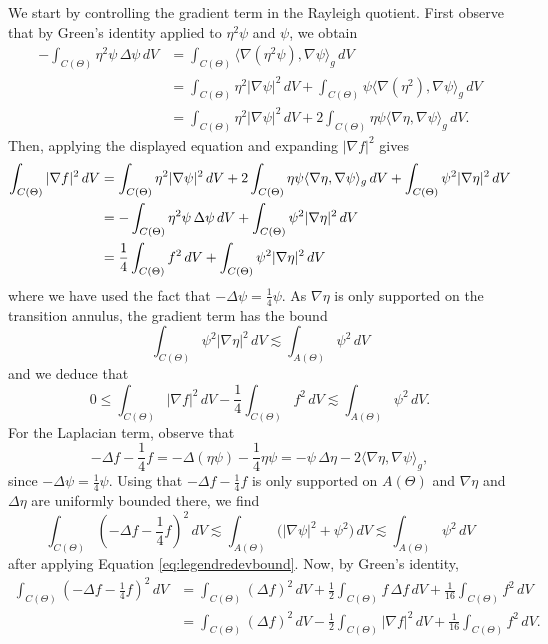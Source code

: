 \documentclass[11pt]{amsart}
\theoremstyle{definition}
\numberwithin{equation}{section}
\newcommand{\lapl}{\Delta}
\newcommand{\grad}{\nabla}
\begin{document}
We start by controlling the gradient term in the Rayleigh quotient. First observe that by Green's identity applied to $\eta^2\psi$ and $\psi$, we obtain
\begin{align*}
-\int_{C(\Theta)} \eta^2\psi\,\Delta\psi\,dV
&= \int_{C(\Theta)} \langle \grad(\eta^2\psi),\grad\psi\rangle_g\,dV \\
&= \int_{C(\Theta)} \eta^2|\grad\psi|^2\,dV
  + \int_{C(\Theta)} \psi\langle \grad(\eta^2),\grad\psi\rangle_g\,dV \\
&= \int_{C(\Theta)} \eta^2|\grad\psi|^2\,dV
  + 2\int_{C(\Theta)} \eta\psi\langle \grad\eta,\grad\psi\rangle_g\,dV.
\end{align*}
Then, applying the displayed equation and expanding $|\grad f|^2$ gives
\begin{align*}
\int_{C(\Theta)} |\grad f|^2\,dV
&= \int_{C(\Theta)} \eta^2|\grad\psi|^2\,dV + 2\int_{C(\Theta)} \eta\psi\langle \grad\eta,\grad\psi\rangle_g\,dV
 + \int_{C(\Theta)} \psi^2|\grad\eta|^2\,dV
  \notag\\
&=
-\int_{C(\Theta)} \eta^2\psi\,\Delta\psi\,dV
   + \int_{C(\Theta)} \psi^2|\grad\eta|^2\,dV \notag\\
&= \frac14\int_{C(\Theta)} f^2\,dV
   + \int_{C(\Theta)} \psi^2|\grad\eta|^2\,dV
\end{align*}
where we have used the fact that $-\lapl \psi = \frac{1}{4}\psi$.  As $\grad \eta$ is only supported on the transition annulus, the gradient term has the bound
\[
\int_{C(\Theta)} \psi^2|\grad \eta|^2 \,dV \lesssim \int_{A(\Theta)} \psi^2 \, dV
\]
and we deduce that
\begin{equation}\label{eq:vibTTgrad-id}
0 \leq \int_{C(\Theta)} |\grad f|^2 \, dV - \frac{1}{4} \int_{C(\Theta)} f^2 \, dV \lesssim \int_{A(\Theta)} \psi^2 \,dV.
\end{equation}
For the Laplacian term, observe that
\[
-\lapl f-\frac14 f
= -\lapl(\eta\psi)-\frac14\eta\psi
= -\psi\,\lapl\eta-2\langle \grad\eta,\grad\psi\rangle_g,
\]
since $-\lapl\psi=\frac14\psi$. Using that $-\lapl f-\frac14 f$ is only supported on
$A(\Theta)$ and $\grad\eta$ and $\lapl\eta$ are uniformly bounded there, we find
\begin{equation}\label{eq:vibTTlapl-error}
\int_{C(\Theta)}\left(-\lapl f-\frac14 f\right)^2\,dV
\lesssim
\int_{A(\Theta)} \bigl(|\grad\psi|^2+\psi^2\bigr)\,dV \lesssim \int_{A(\Theta)} \psi^2 \,dV
\end{equation}
after applying Equation \eqref{eq:legendredevbound}.
Now, by Green's identity,
\begin{align*}
\int_{C(\Theta)}\left(-\lapl f-\frac14 f\right)^2\,dV
&=
\int_{C(\Theta)} (\lapl f)^2\,dV
+\frac12\int_{C(\Theta)} f\,\lapl f\,dV
+\frac1{16}\int_{C(\Theta)} f^2\,dV \\
&=
\int_{C(\Theta)} (\lapl f)^2\,dV
-\frac12\int_{C(\Theta)} |\grad f|^2\,dV
+\frac1{16}\int_{C(\Theta)} f^2\,dV.
\end{align*}
\end{document}
